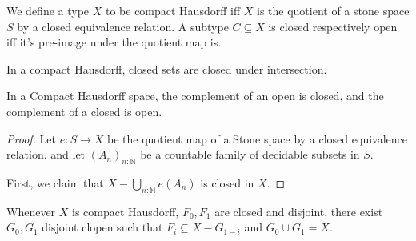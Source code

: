 \begin{definition}
We define a type $X$ to be compact Hausdorff iff 
$X$ is the quotient of a stone space $S$ by a closed equivalence relation. 
%
A subtype $C\subseteq X$ is closed respectively open iff it's pre-image under the quotient map is. 
\end{definition}

\begin{lemma}
  In a compact Hausdorff, closed sets are closed under intersection. 
\end{lemma}



\begin{lemma}
  In a Compact Hausdorff space, the complement of an open is closed, and the complement of a closed is open. 
\end{lemma}
\begin{proof}
  Let $e : S \to X$ be the quotient map of a Stone space by a closed equivalence relation. 
  and let $(A_n)_{n:\mathbb N}$ be a countable family of decidable subsets in $S$. 

  First, we claim that 
  $X - \bigcup_{n:\mathbb N} e(A_n)$
  is closed in $X$. 
\end{proof}

\begin{lemma}
  Whenever $X$ is compact Hausdorff, $F_0, F_1$ are closed and disjoint, 
  there exist $G_0, G_1$ disjoint clopen such that 
  $F_i \subseteq X - G_{1-i}$ and $G_0 \cup G_1 = X$. 
  
\end{lemma}
